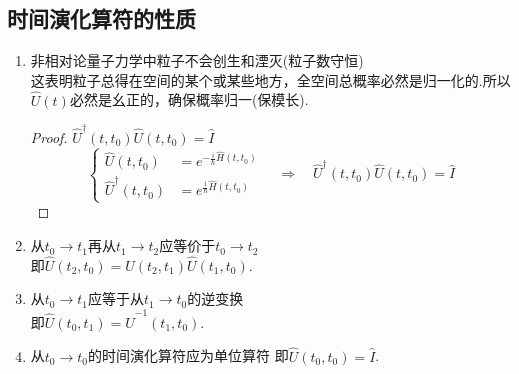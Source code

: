 \subsection{时间演化算符的性质}
\begin{enumerate}
    \item 非相对论量子力学中粒子不会创生和湮灭(粒子数守恒) \\
    这表明粒子总得在空间的某个或某些地方，全空间总概率必然是归一化的.所以$\hat{U}(t)$必然是幺正的，确保概率归一(保模长).
    \begin{proof}
        $\hat{U}^\dagger(t,t_0)\hat{U}(t,t_0)=\hat{I}$
        \[\begin{cases}
            \hat{U}(t,t_0) &= e^{-\frac{i}{\hbar}\hat{H}(t,t_0)} \\
            \hat{U}^\dagger(t,t_0) &= e^{\frac{i}{\hbar}\hat{H}(t,t_0)}
        \end{cases} \quad \Rightarrow \quad \hat{U}^\dagger(t,t_0)\hat{U}(t,t_0)=\hat{I}\]
    \end{proof}
    \item 从$t_0 \rightarrow t_1$再从$t_1 \rightarrow t_2$应等价于$t_0 \rightarrow t_2$ \\
    即$\hat{U}(t_2,t_0)=\hat{U}(t_2,t_1)\hat{U}(t_1,t_0)$.
    \item 从$t_0 \rightarrow t_1$应等于从$t_1 \rightarrow t_0$的逆变换 \\
    即$\hat{U}(t_0,t_1) = \hat{U}^{-1}(t_1,t_0)$.
    \item 从$t_0 \rightarrow t_0$的时间演化算符应为单位算符
    即$\hat{U}(t_0,t_0)=\hat{I}$.
\end{enumerate}

